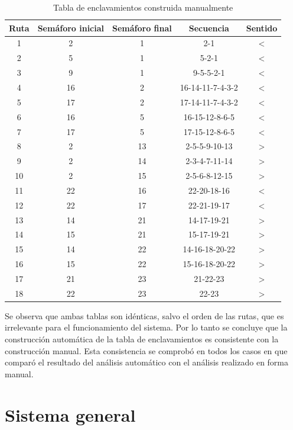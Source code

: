 	 \begin{table}[!hbt]
	\caption{Tabla de enclavamientos construida manualmente}
	\label{tabla_manual}
	\centering
	\begin{tabular}{ c  c  c  c  c }
	\hline
	Ruta & Semáforo inicial & Semáforo final & Secuencia & Sentido \\	
	\hline
		1 & 2 & 1 & 2-1 & < \\
		2 & 5 & 1 & 5-2-1 & < \\
		3 & 9 & 1 & 9-5-5-2-1 & < \\
		4 & 16 & 2 & 16-14-11-7-4-3-2 & < \\
		5 & 17 & 2 & 17-14-11-7-4-3-2 & < \\
		6 & 16 & 5 & 16-15-12-8-6-5 & < \\
		7 & 17 & 5 & 17-15-12-8-6-5 & < \\
		8 & 2 & 13 & 2-5-5-9-10-13 & > \\
		9 & 2 & 14 & 2-3-4-7-11-14 & > \\
		10 & 2 & 15 & 2-5-6-8-12-15 & > \\
		11 & 22 & 16 & 22-20-18-16 & < \\
		12 & 22 & 17 & 22-21-19-17 & < \\
		13 & 14 & 21 & 14-17-19-21 & > \\
		14 & 15 & 21 & 15-17-19-21 & > \\	
		15 & 14 & 22 & 14-16-18-20-22 & > \\	
		16 & 15 & 22 & 15-16-18-20-22 & > \\		
		17 & 21 & 23 & 21-22-23 & > \\	
		18 & 22 & 23 & 22-23 & > \\
	\end{tabular}
	\end{table}
	
	 
	 
	 Se observa que ambas tablas son idénticas, salvo el orden de las rutas, que es irrelevante para el funcionamiento del sistema. Por lo tanto se concluye que la construcción automática de la tabla de enclavamientos es consistente con la construcción manual. Esta consistencia se comprobó en todos los casos en que comparó el resultado del análisis automático con el análisis realizado en forma manual.			

\section{Sistema general}

